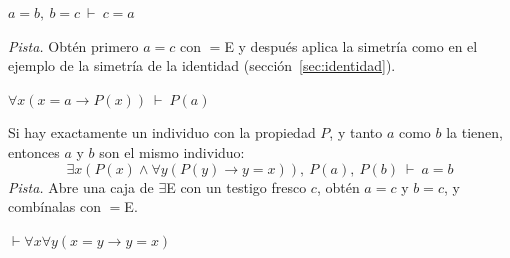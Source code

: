 \begin{pregunta}\label{e4-25}
$a = b, \ b = c \ \vdash \ c = a$

\textit{Pista.} Obtén primero $a = c$ con $=$E y después aplica la simetría como en el ejemplo de la simetría de la identidad (sección~\ref{sec:identidad}).
\end{pregunta}

\begin{pregunta}\label{e4-26}
$\forall x (x = a \to P(x)) \ \vdash \ P(a)$
\end{pregunta}

\begin{pregunta}[Unicidad]\label{e4-27}
Si hay exactamente un individuo con la propiedad $P$, y tanto $a$ como $b$ la tienen, entonces $a$ y $b$ son el mismo individuo:
\[
\exists x (P(x) \land \forall y (P(y) \to y = x)), \ P(a), \ P(b) \ \vdash \ a = b
\]
\textit{Pista.} Abre una caja de $\exists$E con un testigo fresco $c$, obtén $a = c$ y $b = c$, y combínalas con $=$E.
\end{pregunta}

\begin{pregunta}\label{e4-28}
$\vdash \forall x \forall y (x = y \to y = x)$
\end{pregunta}

